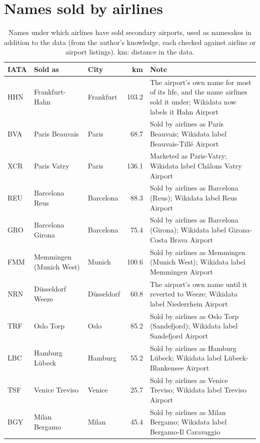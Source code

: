 \documentclass[11pt,a4paper]{article}
\begin{document}
\section{Names sold by airlines}
\begin{small}\begin{longtable}{lp{3.2cm}lrp{6.4cm}}\caption{Names under which airlines have sold secondary airports, used as namesakes in addition to the data (from the author's knowledge, each checked against airline or airport listings). km: distance in the data.}\label{tab:mk}\\\toprule IATA & Sold as & City & km & Note\\\midrule\endhead
HHN & Frankfurt-Hahn & Frankfurt & 103.2 & The airport's own name for most of its life, and the name airlines sold it under; Wikidata now labels it Hahn Airport\\
BVA & Paris Beauvais & Paris & 68.7 & Sold by airlines as Paris Beauvais; Wikidata label Beauvais-Tillé Airport\\
XCR & Paris Vatry & Paris & 136.1 & Marketed as Paris-Vatry; Wikidata label Châlons Vatry Airport\\
REU & Barcelona Reus & Barcelona & 88.3 & Sold by airlines as Barcelona (Reus); Wikidata label Reus Airport\\
GRO & Barcelona Girona & Barcelona & 75.4 & Sold by airlines as Barcelona (Girona); Wikidata label Girona-Costa Brava Airport\\
FMM & Memmingen (Munich West) & Munich & 100.6 & Sold by airlines as Memmingen (Munich West); Wikidata label Memmingen Airport\\
NRN & Düsseldorf Weeze & Düsseldorf & 60.8 & The airport's own name until it reverted to Weeze; Wikidata label Niederrhein Airport\\
TRF & Oslo Torp & Oslo & 85.2 & Sold by airlines as Oslo Torp (Sandefjord); Wikidata label Sandefjord Airport\\
LBC & Hamburg Lübeck & Hamburg & 55.2 & Sold by airlines as Hamburg Lübeck; Wikidata label Lübeck-Blankensee Airport\\
TSF & Venice Treviso & Venice & 25.7 & Sold by airlines as Venice Treviso; Wikidata label Treviso Airport\\
BGY & Milan Bergamo & Milan & 45.4 & Sold by airlines as Milan Bergamo; Wikidata label Bergamo-Il Caravaggio\\
\bottomrule\end{longtable}\end{small}
\end{document}
